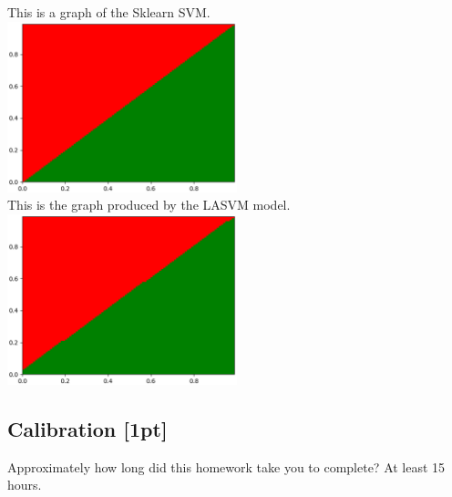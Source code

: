 \documentclass[submit]{harvardml}
\begin{document}
\begin{enumerate}
	This is a graph of the Sklearn SVM.  \\
	\includegraphics[width=0.5\textwidth]{sklearn_SVC.eps}\\
	This is the graph produced by the LASVM model. \\
	\includegraphics[width=0.5\textwidth]{lasvm.eps}\\
\end{enumerate}


\newpage

\subsection*{Calibration [1pt]}
Approximately how long did this homework take you to complete?
At least 15 hours. 
\end{document}
